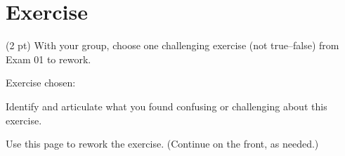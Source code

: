%
%
%
%

\section{Exercise}

(2 pt) With your group, choose one challenging exercise (not true--false) from Exam 01 to rework.

\vspace{0.25in}

\noindent{}Exercise chosen:

\vspace{0.25in}

\noindent{}Identify and articulate what you found confusing or challenging about this exercise.

\vspace{1in}

\noindent{}Use this page to rework the exercise. (Continue on the front, as needed.)